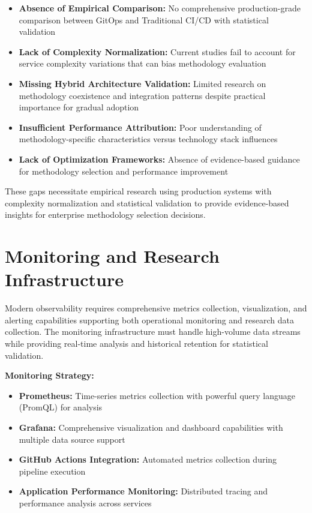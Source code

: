 \begin{itemize}
\item \textbf{Absence of Empirical Comparison:} No comprehensive production-grade comparison between GitOps and Traditional CI/CD with statistical validation
\item \textbf{Lack of Complexity Normalization:} Current studies fail to account for service complexity variations that can bias methodology evaluation
\item \textbf{Missing Hybrid Architecture Validation:} Limited research on methodology coexistence and integration patterns despite practical importance for gradual adoption
\item \textbf{Insufficient Performance Attribution:} Poor understanding of methodology-specific characteristics versus technology stack influences
\item \textbf{Lack of Optimization Frameworks:} Absence of evidence-based guidance for methodology selection and performance improvement
\end{itemize}

These gaps necessitate empirical research using production systems with complexity normalization and statistical validation to provide evidence-based insights for enterprise methodology selection decisions.

\section{Monitoring and Research Infrastructure}

Modern observability requires comprehensive metrics collection, visualization, and alerting capabilities supporting both operational monitoring and research data collection. The monitoring infrastructure must handle high-volume data streams while providing real-time analysis and historical retention for statistical validation.

\textbf{Monitoring Strategy:}
\begin{itemize}
\item \textbf{Prometheus:} Time-series metrics collection with powerful query language (PromQL) for analysis
\item \textbf{Grafana:} Comprehensive visualization and dashboard capabilities with multiple data source support
\item \textbf{GitHub Actions Integration:} Automated metrics collection during pipeline execution
\item \textbf{Application Performance Monitoring:} Distributed tracing and performance analysis across services
\end{itemize}


